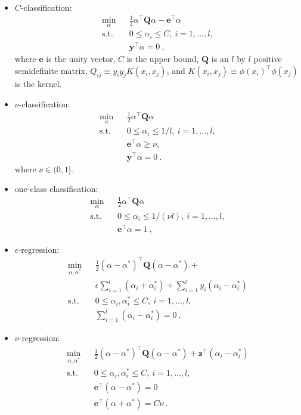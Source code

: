\documentclass[a4paper]{article}
\begin{document}
\begin{itemize}
 \item $C$-classification:\\
  \begin{eqnarray}
    \min_\alpha&&\frac{1}{2}\alpha^\top \mathbf{Q} \alpha-\mathbf{e}^\top\alpha \nonumber\\
    \mbox{s.t.} &&0\le\alpha_i\le C,~i=1,\ldots,l,\\
    &&\mathbf{y}^\top\alpha=0~, \nonumber
  \end{eqnarray}
  where $\mathbf{e}$ is the unity vector, $C$ is the upper bound, $\mathbf{Q}$ is an $l$
  by $l$ positive semidefinite matrix, $Q_{ij} \equiv y_i y_j K(x_i,
  x_j)$, and $K(x_i, x_j) \equiv \phi(x_i)^\top\phi(x_j)$ is the
  kernel.
 \item $\nu$-classification:\\
  \begin{eqnarray}
    \min_\alpha&&\frac{1}{2}\alpha^\top \mathbf{Q} \alpha \nonumber\\
    \mbox{s.t.}&&0\le\alpha_i\le 1/l,~i=1,\ldots,l,\\
    &&\mathbf{e}^\top \alpha \ge \nu, \nonumber\\
    &&\mathbf{y}^\top\alpha=0~. \nonumber
  \end{eqnarray}
  where $\nu \in (0,1]$.
 \item one-class classification:\\
  \begin{eqnarray}
    \min_\alpha&&\frac{1}{2}\alpha^\top \mathbf{Q} \alpha \nonumber\\
    \mbox{s.t.} &&0\le\alpha_i\le 1/(\nu l),~i=1,\ldots,l,\\
    &&\mathbf{e}^\top\alpha=1~,\nonumber
  \end{eqnarray}
 \item $\epsilon$-regression:\\
  \begin{eqnarray}
    \min_{\alpha, \alpha^*}&&\frac{1}{2}(\alpha-\alpha^*)^\top \mathbf{Q}
    (\alpha-\alpha^*) +  \nonumber\\
    &&\epsilon\sum_{i=1}^{l}(\alpha_i+\alpha_i^*) + \sum_{i=1}^{l}y_i(\alpha_i-\alpha_i^*) \nonumber\\
    \mbox{s.t.} &&0\le\alpha_i, \alpha_i^*\le C,~i=1,\ldots,l,\\
    &&\sum_{i=1}^{l}(\alpha_i-\alpha_i^*)=0~.\nonumber
  \end{eqnarray}
 \item $\nu$-regression:\\
  \begin{eqnarray}
    \min_{\alpha, \alpha^*}&&\frac{1}{2}(\alpha-\alpha^*)^\top \mathbf{Q}
    (\alpha-\alpha^*) + \mathbf{z}^\top(\alpha_i-\alpha_i^*) \nonumber\\
    \mbox{s.t.} &&0\le\alpha_i, \alpha_i^*\le C,~i=1,\ldots,l,\\
    &&\mathbf{e}^\top(\alpha-\alpha^*)=0\nonumber\\
    &&\mathbf{e}^\top(\alpha+\alpha^*)=C\nu~.\nonumber
  \end{eqnarray}
  
\end{itemize}
\end{document}
